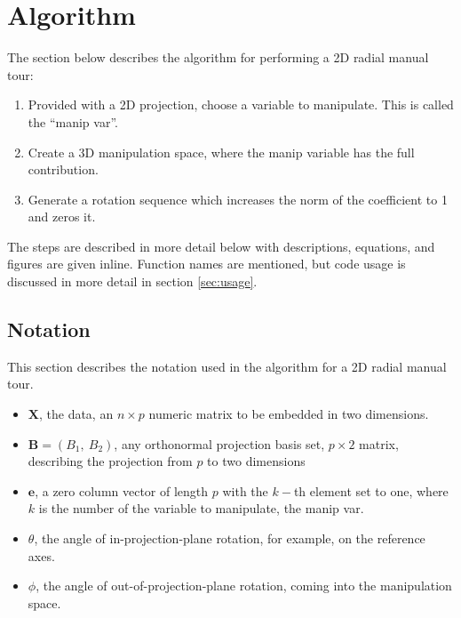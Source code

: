 \hypertarget{sec:algorithm}{%
\section{Algorithm}\label{sec:algorithm}}

The section below describes the algorithm for performing a 2D radial
manual tour:

\begin{enumerate}
\def\labelenumi{\arabic{enumi}.}
\tightlist
\item
  Provided with a 2D projection, choose a variable to manipulate. This
  is called the ``manip var''.
\item
  Create a 3D manipulation space, where the manip variable has the full
  contribution.
\item
  Generate a rotation sequence which increases the norm of the
  coefficient to 1 and zeros it.
\end{enumerate}

The steps are described in more detail below with descriptions,
equations, and figures are given inline. Function names are mentioned,
but code usage is discussed in more detail in section \ref{sec:usage}.

\hypertarget{notation}{%
\subsection{Notation}\label{notation}}

This section describes the notation used in the algorithm for a 2D
radial manual tour.

\begin{itemize}
  \item $\textbf{X}$, the data, an $n \times p$ numeric matrix to be embedded in two dimensions.
  \item $\textbf{B} = (B_1,~ B_2)$, any orthonormal projection basis set, $p \times 2$ matrix, describing the projection from $p$ to two dimensions
  \item $\textbf{e}$, a zero column vector of length $p$ with the $k-$th element set to one, where $k$ is the number of the variable to manipulate, the manip var.
  \item $\theta$, the angle of in-projection-plane rotation, for example, on the reference axes.
  \item $\phi$, the angle of out-of-projection-plane rotation, coming into the manipulation space.
\end{itemize}

